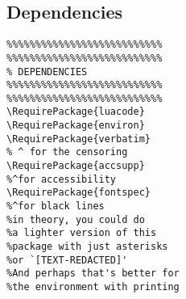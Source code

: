 \documentclass{article}
\begin{document}
\subsection{Dependencies}
\begin{verbatim}
%%%%%%%%%%%%%%%%%%%%%%%%%%%
%%%%%%%%%%%%%%%%%%%%%%%%%%%
% DEPENDENCIES
%%%%%%%%%%%%%%%%%%%%%%%%%%%
%%%%%%%%%%%%%%%%%%%%%%%%%%%
\RequirePackage{luacode}
\RequirePackage{environ}
\RequirePackage{verbatim}
% ^ for the censoring
\RequirePackage{accsupp}
%^for accessibility
\RequirePackage{fontspec}
%^for black lines
%in theory, you could do 
%a lighter version of this
%package with just asterisks 
%or `[TEXT-REDACTED]'
%And perhaps that's better for
%the environment with printing
\end{verbatim}
\end{document}
